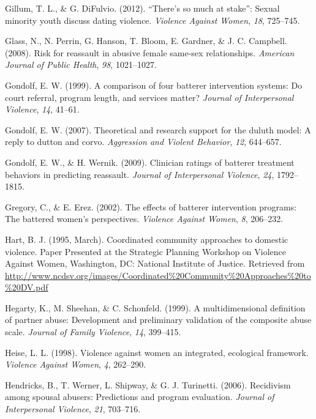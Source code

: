 \documentclass[11pt,]{tufte-book}
\begin{document}
\hypertarget{ref-gillum2012there}{}
Gillum, T. L., \& G. DiFulvio. (2012). ``There's so much at stake'':
Sexual minority youth discuss dating violence. \emph{Violence Against
Women}, \emph{18}, 725--745.

\hypertarget{ref-glass2008risk}{}
Glass, N., N. Perrin, G. Hanson, T. Bloom, E. Gardner, \& J. C.
Campbell. (2008). Risk for reassault in abusive female same-sex
relationships. \emph{American Journal of Public Health}, \emph{98},
1021--1027.

\hypertarget{ref-gondolf1999comparison}{}
Gondolf, E. W. (1999). A comparison of four batterer intervention
systems: Do court referral, program length, and services matter?
\emph{Journal of Interpersonal Violence}, \emph{14}, 41--61.

\hypertarget{ref-gondolf2007theoretical}{}
Gondolf, E. W. (2007). Theoretical and research support for the duluth
model: A reply to dutton and corvo. \emph{Aggression and Violent
Behavior}, \emph{12}, 644--657.

\hypertarget{ref-gondolf2009clinician}{}
Gondolf, E. W., \& H. Wernik. (2009). Clinician ratings of batterer
treatment behaviors in predicting reassault. \emph{Journal of
Interpersonal Violence}, \emph{24}, 1792--1815.

\hypertarget{ref-gregory2002effects}{}
Gregory, C., \& E. Erez. (2002). The effects of batterer intervention
programs: The battered women's perspectives. \emph{Violence Against
Women}, \emph{8}, 206--232.

\hypertarget{ref-hart1995coordinated}{}
Hart, B. J. (1995, March). Coordinated community approaches to domestic
violence. Paper Presented at the Strategic Planning Workshop on Violence
Against Women, Washington, DC: National Institute of Justice. Retrieved
from
\url{http://www.ncdsv.org/images/Coordinated\%20Community\%20Approaches\%20to\%20DV.pdf}

\hypertarget{ref-hegarty1999multidimensional}{}
Hegarty, K., M. Sheehan, \& C. Schonfeld. (1999). A multidimensional
definition of partner abuse: Development and preliminary validation of
the composite abuse scale. \emph{Journal of Family Violence}, \emph{14},
399--415.

\hypertarget{ref-heise1998violence}{}
Heise, L. L. (1998). Violence against women an integrated, ecological
framework. \emph{Violence Against Women}, \emph{4}, 262--290.

\hypertarget{ref-hendricks2006recidivism}{}
Hendricks, B., T. Werner, L. Shipway, \& G. J. Turinetti. (2006).
Recidivism among spousal abusers: Predictions and program evaluation.
\emph{Journal of Interpersonal Violence}, \emph{21}, 703--716.
\end{document}
